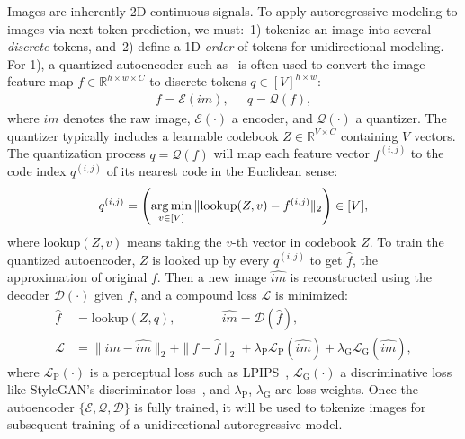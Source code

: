 Images are inherently 2D continuous signals.
To apply autoregressive modeling to images via next-token prediction, we must:\, 1) tokenize an image into several \textit{discrete} tokens, and\, 2) define a 1D \textit{order} of tokens for unidirectional modeling.\, For 1), a quantized autoencoder such as~\cite{vqgan} is often used to convert the image feature map $f \in \mathbb{R}^{h\times w\times C}$ to discrete tokens $q \in [V]^{h\times w}$:
\begin{align}
    f = \mathcal{E}(im), \quad~~
    q = \mathcal{Q}(f),
\end{align}
where $im$ denotes the raw image, $\mathcal{E}(\cdot)$ a encoder, and $\mathcal{Q}(\cdot)$ a quantizer.
The quantizer typically includes a learnable codebook $Z \in \mathbb{R}^{V\times C}$ containing $V$ vectors.
The quantization process $q = \mathcal{Q}(f)$ will map each feature vector $f^{(i,j)}$ to the code index $q^{(i,j)}$ of its nearest code in the Euclidean sense:
\begin{align}
    q^{(i,j)} = \left( \operatorname*{arg\,min}_{v \in [V]} \| \text{lookup}(Z, v) - f^{(i,j)} \|_2 \right) \in [V],
\end{align}
where $\text{lookup}(Z, v)$ means taking the $v$-th vector in codebook $Z$.
To train the quantized autoencoder, $Z$ is looked up by every $q^{(i,j)}$ to get $\hat{f}$, the approximation of original $f$. Then a new image $\hat{im}$ is reconstructed using the decoder $\mathcal{D}(\cdot)$ given $\hat{f}$, and a compound loss $\mathcal{L}$ is minimized:
\begin{align}
    \hat{f} &= \text{lookup}(Z, q), %
    \quad\quad\quad~~~ \hat{im} = \mathcal{D}(\hat{f}), \\
    \mathcal{L} &= \|im - \hat{im}\|_2 + \|f - \hat{f}\|_2 + \lambda_{\text{P}} \mathcal{L}_{\text{P}}(\hat{im}) + \lambda_{\text{G}} \mathcal{L}_{\text{G}}(\hat{im}), \label{eq:vaeloss}
\end{align}
where $\mathcal{L}_{\text{P}}(\cdot)$ is a perceptual loss such as LPIPS~\cite{lpips}, $\mathcal{L}_{\text{G}}(\cdot)$ a discriminative loss like StyleGAN's discriminator loss~\cite{stylegan}, and $\lambda_{\text{P}}$, $\lambda_{\text{G}}$ are loss weights.
Once the autoencoder $\{\mathcal{E}, \mathcal{Q}, \mathcal{D}\}$ is fully trained, it will be used to tokenize images for subsequent training of a unidirectional autoregressive model. 

